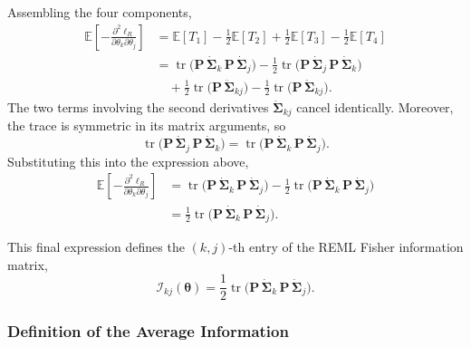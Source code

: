 \documentclass[
  letterpaper,
  DIV=11,
  numbers=noendperiod]{scrartcl}
\begin{document}
Assembling the four components, \begin{align}
\mathbb{E}\!\left[ -\frac{\partial^2 \ell_R}{\partial \theta_k \partial \theta_j} \right]
&= \mathbb{E}[T_1] - \frac12 \mathbb{E}[T_2] + \frac12 \mathbb{E}[T_3] - \frac12 \mathbb{E}[T_4] \\[4pt]
&= \operatorname{tr}\!\big( \symbf{P}\,\dot{\symbf{\Sigma}}_k\,\symbf{P}\,\dot{\symbf{\Sigma}}_j \big)
- \frac12 \operatorname{tr}\!\big( \symbf{P}\,\dot{\symbf{\Sigma}}_j\,\symbf{P}\,\dot{\symbf{\Sigma}}_k \big) \\
&\quad + \frac12 \operatorname{tr}\!\big( \symbf{P}\,\ddot{\symbf{\Sigma}}_{kj} \big)
- \frac12 \operatorname{tr}\!\big( \symbf{P}\,\ddot{\symbf{\Sigma}}_{kj} \big).
\end{align} The two terms involving the second derivatives
\(\ddot{\symbf{\Sigma}}_{kj}\) cancel identically. Moreover, the trace
is symmetric in its matrix arguments, so \begin{equation}
\operatorname{tr}\!\big( \symbf{P}\,\dot{\symbf{\Sigma}}_j\,\symbf{P}\,\dot{\symbf{\Sigma}}_k \big)
= \operatorname{tr}\!\big( \symbf{P}\,\dot{\symbf{\Sigma}}_k\,\symbf{P}\,\dot{\symbf{\Sigma}}_j \big).
\end{equation} Substituting this into the expression above,
\begin{align}
\mathbb{E}\!\left[ -\frac{\partial^2 \ell_R}{\partial \theta_k \partial \theta_j} \right]
&= \operatorname{tr}\!\big( \symbf{P}\,\dot{\symbf{\Sigma}}_k\,\symbf{P}\,\dot{\symbf{\Sigma}}_j \big)
- \frac12 \operatorname{tr}\!\big( \symbf{P}\,\dot{\symbf{\Sigma}}_k\,\symbf{P}\,\dot{\symbf{\Sigma}}_j \big) \\[4pt]
&= \frac12 \operatorname{tr}\!\big( \symbf{P}\,\dot{\symbf{\Sigma}}_k\,\symbf{P}\,\dot{\symbf{\Sigma}}_j \big).
\end{align}

This final expression defines the \((k,j)\)-th entry of the REML Fisher
information matrix, \begin{equation}
\mathcal{I}_{kj}(\symbf{\theta}) = \frac12 \operatorname{tr}\!\big( \symbf{P}\,\dot{\symbf{\Sigma}}_k\,\symbf{P}\,\dot{\symbf{\Sigma}}_j \big).
\end{equation}

\subsubsection{Definition of the Average
Information}\label{definition-of-the-average-information}
\end{document}
